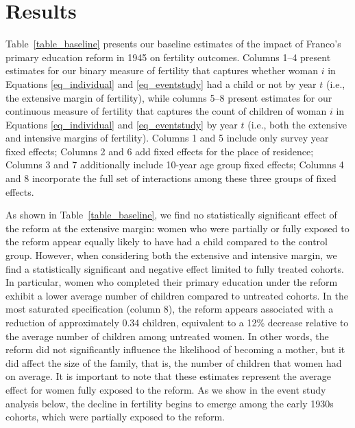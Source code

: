 \documentclass[a4paper,oneside,final,onecolumn,12pt,english]{article}
\begin{document}
\section{Results} \label{results}



Table~\ref{table_baseline} presents our baseline estimates of the impact of Franco's primary education reform in 1945 on fertility outcomes. Columns 1–4 present estimates for our binary measure of fertility that captures whether woman $i$ in Equations \ref{eq_individual} and \ref{eq_eventstudy} had a child or not by year $t$ (i.e., the extensive margin of fertility), while columns 5–8 present estimates for our continuous measure of fertility that captures the count of children of woman $i$ in Equations \ref{eq_individual} and \ref{eq_eventstudy} by year $t$ (i.e., both the extensive and intensive margins of fertility). Columns 1 and 5 include only survey year fixed effects; Columns 2 and 6 add fixed effects for the place of residence; Columns 3 and 7 additionally include 10-year age group fixed effects; Columns 4 and 8 incorporate the full set of interactions among these three groups of fixed effects. 

As shown in Table~\ref{table_baseline}, we find no statistically significant effect of the reform at the extensive margin: women who were partially or fully exposed to the reform appear equally likely to have had a child compared to the control group. However, when considering both the extensive and intensive margin, we find a statistically significant and negative effect limited to fully treated cohorts. In particular, women who completed their primary education under the reform exhibit a lower average number of children compared to untreated cohorts. In the most saturated specification (column 8), the reform appears associated with a reduction of approximately 0.34 children, equivalent to a 12\% decrease relative to the average number of children among untreated women. In other words, the reform did not significantly influence the likelihood of becoming a mother, but it did affect the size of the family, that is, the number of children that women had on average. It is important to note that these estimates represent the average effect for women fully exposed to the reform. As we show in the event study analysis below, the decline in fertility begins to emerge among the early 1930s cohorts, which were partially exposed to the reform.
\end{document}
